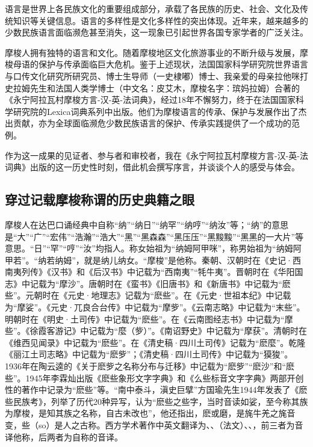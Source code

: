语言是世界上各民族文化的重要组成部分，承载了各民族的历史、社会、文化及传统知识等关键信息。语言的多样性是文化多样性的突出体现。近年来，越来越多的少数民族语言面临濒危甚至消失，这一现象已引起世界各国专家学者的广泛关注。

摩梭人拥有独特的语言和文化。随着摩梭地区文化旅游事业的不断升级与发展，摩梭母语的保护与传承面临巨大危机。鉴于上述现状，法国国家科学研究院世界语言与口传文化研究所研究员、博士生导师（一史棣嘟）博士、我亲爱的母亲拉他咪打史拉姆先生和法国人类学博士（中文名：皮艾木，摩梭名字：瑸妈拉姆）合著的《永宁阿拉瓦村摩梭方言-汉-英-法词典》，经过18年不懈努力，终于在法国国家科学研究院的Lexica词典系列中出版。他们为摩梭语言的传承、保护与发展作出了杰出贡献，亦为全球面临濒危少数民族语言的保护、传承实践提供了一个成功的范例。

作为这一成果的见证者、参与者和审校者，我在《永宁阿拉瓦村摩梭方言-汉-英-法词典》出版的这一历史性时刻，借此机会撰写序言，并谈谈个人的感受与体会。

\subsection*{穿过记载摩梭称谓的历史典籍之眼}

摩梭人在达巴口诵经典中自称“纳”“纳日”“纳罕”“纳哼”“纳汝”等；“纳”的意思是“大”“广”“宏伟”“浩瀚”“浩大”“黑”“黑森森”“黑压压”“黑黢黢”“黑黑的一大片”等意思。“日”“罕”“哼”“汝”均指人。称女始祖为“纳姆阿甲咪”，称男始祖为“纳姆阿甲若”。“纳若纳姆”，就是纳儿纳女。“摩梭”是他称。秦朝、汉朝时在《史记·西南夷列传》《汉书》和《后汉书》中记载为“西南夷”“牦牛夷”。晋朝时在《华阳国志》中记载为“摩沙”。唐朝时在《蛮书》《旧唐书》和《新唐书》中记载为“麽些”。元朝时在《元史·地理志》记载为“麽些”。在《元史·世祖本纪》中记载为“摩娑”。《元史·兀良合台传》中记载为“摩㱔”。《云南志略》中记载为“末些”。明朝时在《明史·土司传》中记载为“麽些”。在《云南图经志书》中记载为“摩些”。《徐霞客游记》中记载为“麼（㱔）”。《南诏野史》中记载为“摩获”。清朝时在《维西见闻录》中记载为“麽些”。在《清史稿·四川土司传》记载为“麽麼”。乾隆《丽江土司志略》中记载为“麽㱔”；《清史稿·四川土司传》中记载为“獏狻”。1936年在陶云逵的《关于麽㱔之名称分布与迁移》中记载为“麽㱔”“麽沙”和“麽些”。1945年李霖灿出版《麽些象形文字字典》和《么些标音文字字典》两部开创性的著作中记录为“麽些”等。“南中泰斗，滇史巨擘”方国瑜先生1944年发表了《麽些民族考》，列举了历代20种异写，认为“麽些之些字，当时音读如娑，至今称其族为摩梭，是知其族之名称，自古未改也”，他还指出，麽或磨，是旄牛羌之旄音变，些（so）是人之古称。西方学术著作中英文翻译为、、（法文）、、，前三者为音译他称，后两者为自称的音译。

